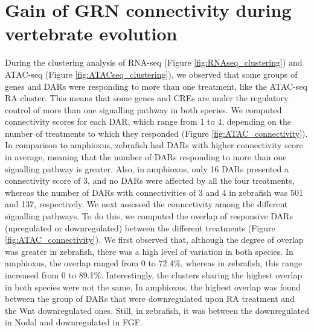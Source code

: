 \newpage

\section{Gain of GRN connectivity during vertebrate evolution}
\label{sec:Interconnectivity_chatper_sub2}

During the clustering analysis of RNA-seq (Figure \ref{fig:RNAseq_clustering}) and ATAC-seq (Figure \ref{fig:ATACseq_clustering}), we observed that some groups of genes and DARs were responding to more than one treatment, like the ATAC-seq RA cluster. This means that some genes and CREs are under the regulatory control of more than one signalling pathway in both species. We computed connectivity scores for each DAR, which range from 1 to 4, depending on the number of treatments to which they responded (Figure \ref{fig:ATAC_connectivity}). In comparison to amphioxus, zebrafish had DARs with higher connectivity score in average, meaning that the number of DARs responding to more than one signalling pathway is greater. Also, in amphioxus, only 16 DARs presented a connectivity score of 3, and no DARs were affected by all the four treatments, whereas the number of DARs with connectivities of 3 and 4 in zebrafish was 501 and 137, respectively. 
We next assessed the connectivity among the different signalling pathways. To do this, we computed the overlap of responsive DARs (upregulated or downregulated) between the different treatments (Figure \ref{fig:ATAC_connectivity}). We first observed that, although the degree of overlap was greater in zebrafish, there was a high level of variation in both species. In amphioxus, the overlap ranged from 0 to 72.4\%, whereas in zebrafish, this range increased from 0 to 89.1\%. Interestingly, the clusters sharing the highest overlap in both species were not the same. In amphioxus, the highest overlap was found between the group of DARs that were downregulated upon RA treatment and the Wnt downregulated ones. Still, in zebrafish, it was between the downregulated in Nodal and downregulated in FGF.
 
